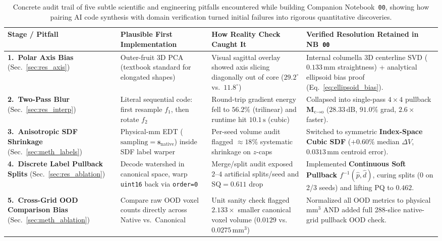 \documentclass[10pt,a4paper]{article}
\renewcommand{\_}{\origunderscore\allowbreak}
\begin{document}
\begin{table}[htbp]
\centering
\caption[Audit trail of five subtle pitfalls caught during human--AI iterative development]{Concrete audit trail of five subtle scientific and engineering pitfalls encountered while building Companion Notebook~\texttt{00}, showing how pairing AI code synthesis with domain verification turned initial failures into rigorous quantitative discoveries.}
\label{tab:ai_audit_trail}
{\scriptsize
\setlength{\tabcolsep}{3.5pt}
\renewcommand{\arraystretch}{1.25}
\begin{tabularx}{\textwidth}{L{2.55cm} L{3.35cm} L{3.15cm} Y}
\toprule
{}\textbf{Stage / Pitfall} & \textbf{Plausible First Implementation} & \textbf{How Reality Check Caught It} & \textbf{Verified Resolution Retained in NB~\texttt{00}} \\
\midrule
\textbf{1.\ Polar Axis Bias} (Sec.~\ref{sec:res_axis}) & Outer-fruit 3D PCA (textbook standard for elongated shapes) & Visual sagittal overlay showed axis slicing diagonally out of core ($29.2^\circ$ vs.\ $11.8^\circ$) & Internal columella 3D centerline SVD ($0.133\,\text{mm}$ straightness) + analytical ellipsoid bias proof (Eq.~\ref{eq:ellipsoid_bias}). \\
\textbf{2.\ Two-Pass Blur} (Sec.~\ref{sec:res_interp}) & Literal sequential code: first resample $f_1$, then rotate $f_2$ & Round-trip gradient energy fell to $56.2\%$ (trilinear) and runtime hit $10.1\,\text{s}$ (cubic) & Collapsed into single-pass $4\times 4$ pullback $\mathbf{M}_{\text{c}\to\text{o}}$ ($28.33\,\text{dB}$, $91.0\%$ grad, $2.6\times$ faster). \\
\textbf{3.\ Anisotropic SDF Shrinkage} (Sec.~\ref{sec:meth_labels}) & Physical-mm EDT ($\text{sampling}=\mathbf{s}_{\text{native}}$) inside SDF label warper & Per-seed volume audit flagged $\approx 18\%$ systematic shrinkage on $z$-caps & Switched to symmetric \textbf{Index-Space Cubic SDF} ($+0.60\%$ median $\Delta V$, $0.0313\,\text{mm}$ centroid error). \\
\textbf{4.\ Discrete Label Pullback Splits} (Sec.~\ref{sec:res_ablation}) & Decode watershed in canonical space, warp \texttt{uint16} back via \texttt{order=0} & Merge/split audit exposed $2\text{--}4$ artificial splits/seed and $\text{SQ}=0.611$ drop & Implemented \textbf{Continuous Soft Pullback $f^{-1}(\hat{p},\hat{d})$}, curing splits ($0$ on 2/3 seeds) and lifting $\text{PQ}$ to $0.462$. \\
\textbf{5.\ Cross-Grid OOD Comparison Bias} (Sec.~\ref{sec:meth_ablation}) & Compare raw OOD voxel counts directly across Native vs.\ Canonical & Unit sanity check flagged $2.133\times$ smaller canonical voxel volume ($0.0129$ vs.\ $0.0275\,\text{mm}^3$) & Normalized all OOD metrics to physical $\text{mm}^3$ AND added full 288-slice native-grid pullback OOD check. \\
\bottomrule
\end{tabularx}
}
\end{table}
\end{document}
